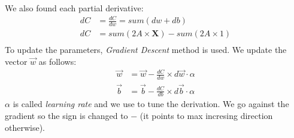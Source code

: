 We also found each partial derivative:
\begin{align}
  dC &= \frac{dC}{dw} = sum(dw+db)\\
 dC &= sum(2A\times{}\mathbf{X}) - sum(2A\times{}1)\\
\end{align}
To update the parameters, \textit{Gradient Descent} method is used. We update the vector $\vec{w}$ as follows:
\begin{align}
  \vec{w} &= \vec{w} -\frac{dC}{dw}\times{}d\vec{w}\cdot{}\alpha\\
  \vec{b} &= \vec{b} -\frac{dC}{db}\times{}d\vec{b}\cdot{}\alpha
\end{align}
$\alpha$ is called \textit{learning rate} and we use to tune the derivation. We go against the gradient so the sign is changed to $-$ (it points to max incresing direction otherwise).
